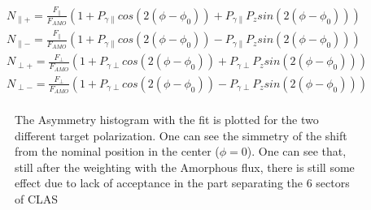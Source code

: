 \begin{eqnarray}
N_{\parallel +} = \frac{F_{\parallel}}{F_{AMO}} \left( 1 + P_{\gamma \parallel}cos(2(\phi-\phi_0)) + P_{\gamma \parallel} P_z sin(2(\phi-\phi_0)) \right) \\
N_{\parallel -} = \frac{F_{\parallel}}{F_{AMO}} \left( 1 + P_{\gamma \parallel}cos(2(\phi-\phi_0)) - P_{\gamma \parallel} P_z sin(2(\phi-\phi_0)) \right) \\
N_{\perp +} = \frac{F_{\perp}}{F_{AMO}} \left( 1 + P_{\gamma \perp}cos(2(\phi-\phi_0)) + P_{\gamma \perp} P_z sin(2(\phi-\phi_0)) \right) \\
N_{\perp -} = \frac{F_{\perp}}{F_{AMO}} \left( 1 + P_{\gamma \perp}cos(2(\phi-\phi_0)) - P_{\gamma \perp} P_z sin(2(\phi-\phi_0)) \right) \\
\end{eqnarray}
\begin{figure}[htb]
  \begin{center}
    \caption{The Asymmetry histogram with the fit is plotted for the two different target polarization. One can see the simmetry of the shift from the nominal position in the center ($\phi = 0$).  One can see that, still after the weighting with the Amorphous flux, there is still some effect due to lack of acceptance in the part separating the 6 sectors of CLAS}
  \end{center}
\end{figure}

